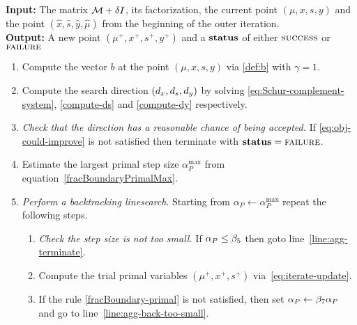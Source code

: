 \documentclass{article}
\begin{document}
\begin{algorithm}[H]
\textbf{Input:} The matrix $\mathcal{M} + \delta I$, its factorization, the current point $(\mu, x, s, y)$ and the point $(\hat{x}, \hat{s},  \hat{y}, \hat{\mu})$ from the beginning of the outer iteration.   \\
\textbf{Output:} A new point $(\mu^{+}, x^{+}, s^{+}, y^{+})$ and a $\textbf{status}$ of either $\textsc{success}$ or $\textsc{failure}$
\begin{enumerate}[label*=A.{\arabic*}]
\item Compute the vector $b$ at the point $(\mu, x, s, y)$ via \eqref{def:b} with $\gamma = 1$.
\item Compute the search direction $(d_{x}, d_{s}, d_{y})$ by solving \eqref{eq:Schur-complement-system}, \eqref{compute-ds} and \eqref{compute-dy} respectively.
\item \emph{Check that the direction has a reasonable chance of being accepted.} If \eqref{eq:obj-could-improve} is not satisfied then terminate with $\textbf{status} = \textsc{failure}$.
\item Estimate the largest primal step size $\alpha^{\max}_{P}$ from equation~\eqref{fracBoundaryPrimalMax}.
\item \label{agg:line:back-track} \emph{Perform a backtracking linesearch}. Starting from $\alpha_{P} \gets \alpha^{\max}_{P}$ repeat the following steps.
\begin{enumerate}[label*=.{\arabic*}]
\item \label{line:agg-back-too-small} \emph{Check the step size is not too small.} If $\alpha_{P} \le \beta_{5}$ then goto line~\ref{line:agg-terminate}.
\item Compute the trial primal variables $(\mu^{+}, x^{+}, s^{+})$ via~\eqref{eq:iterate-update}.
\item If the \fracBound{} rule \eqref{fracBoundary-primal} is not satisfied, then set $\alpha_{P} \gets \beta_{7} \alpha_{P}$ and go to line~\ref{line:agg-back-too-small}. 

\end{enumerate}
\end{enumerate}
\end{algorithm}
\end{document}

